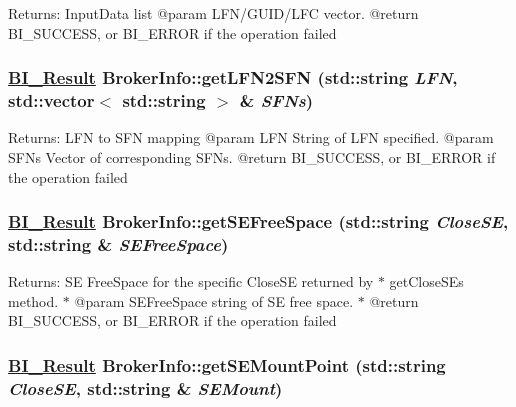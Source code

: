 \begin{Desc}
\item[Returns:]Input\-Data list @param LFN/GUID/LFC vector. @return BI\_\-SUCCESS, or BI\_\-ERROR if the operation failed \end{Desc}
\hypertarget{classBrokerInfo_a4}{
\subsubsection[getLFN2SFN]{\setlength{\rightskip}{0pt plus 5cm}\hyperlink{bi__result_8h_a2}{BI\_\-Result} Broker\-Info::get\-LFN2SFN (std::string {\em LFN}, std::vector$<$ std::string $>$ \& {\em SFNs})}}
\label{classBrokerInfo_a4}


\begin{Desc}
\item[Returns:]LFN to SFN mapping @param LFN String of LFN specified. @param SFNs Vector of corresponding SFNs. @return BI\_\-SUCCESS, or BI\_\-ERROR if the operation failed \end{Desc}
\hypertarget{classBrokerInfo_a10}{
\subsubsection[getSEFreeSpace]{\setlength{\rightskip}{0pt plus 5cm}\hyperlink{bi__result_8h_a2}{BI\_\-Result} Broker\-Info::get\-SEFree\-Space (std::string {\em Close\-SE}, std::string \& {\em SEFree\-Space})}}
\label{classBrokerInfo_a10}


\begin{Desc}
\item[Returns:]SE Free\-Space for the specific Close\-SE returned by $\ast$  get\-Close\-SEs method. $\ast$ @param SEFree\-Space string of SE free space. $\ast$ @return BI\_\-SUCCESS, or BI\_\-ERROR if the operation failed \end{Desc}
\hypertarget{classBrokerInfo_a9}{
\subsubsection[getSEMountPoint]{\setlength{\rightskip}{0pt plus 5cm}\hyperlink{bi__result_8h_a2}{BI\_\-Result} Broker\-Info::get\-SEMount\-Point (std::string {\em Close\-SE}, std::string \& {\em SEMount})}}
\label{classBrokerInfo_a9}


